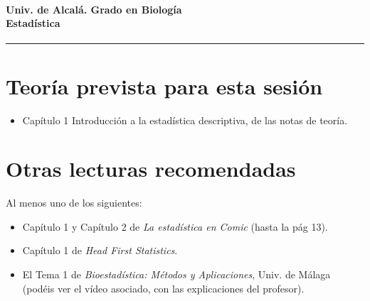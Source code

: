 \documentclass[10pt,a4paper]{article}
\begin{document}

\paragraph{Univ. de Alcal\'{a}. \hspace{6cm}Grado en Biología\\[2mm]
\hspace{9.2cm}Estadística
}
\noindent\hrule

\setcounter{section}{0}
\section*{}

\setcounter{tocdepth}{1}


\section{Teoría prevista para esta sesión}

\begin{itemize}
 \item Capítulo 1 {\sf Introducción a la estadística descriptiva}, de las notas de teoría.
\end{itemize}

\section*{Otras lecturas recomendadas}

Al menos uno de los siguientes:
    \begin{itemize}
    \item Capítulo 1 y Capítulo 2 de {\em La estadística en Comic} (hasta la pág 13).
    \item Capítulo 1 de {\em Head First Statistics}.
    \item El Tema 1 de {\em Bioestadística: Métodos y Aplicaciones}, Univ. de Málaga (podéis ver el vídeo asociado, con las explicaciones del profesor).
    \end{itemize}
\end{document}
